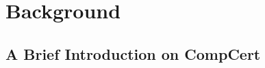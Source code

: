 \section{Background}
\label{sec:compiler:background}

\subsection{A Brief Introduction on CompCert}



